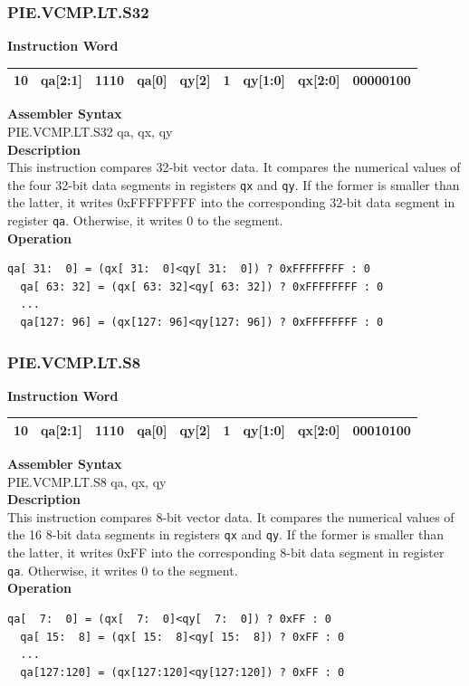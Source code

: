 \newpage
\subsubsection{PIE.VCMP.LT.S32}\label{instruction:PIEVCMPLTS32}
\setlength\tabcolsep{6pt}
\textbf{Instruction Word} \\
\begin{tabular}{|c|c|c|c|c|c|c|c|c|}
	\hline
	10 & qa[2:1] & 1110 & qa[0] & qy[2] & 1 & qy[1:0] & qx[2:0] & 00000100 \\
	\hline
\end{tabular}

\textbf{Assembler Syntax} \\
PIE.VCMP.LT.S32 qa, qx, qy \\
\textbf{Description} \\
This instruction compares 32-bit vector data. It compares the numerical values of the four 32-bit data segments in registers \lstinline{qx} and \lstinline{qy}. If the former is smaller than the latter, it writes 0xFFFFFFFF into the corresponding 32-bit data segment in register \lstinline{qa}. Otherwise, it writes 0 to the segment.\\
\textbf{Operation}
\begin{lstlisting}[escapeinside=`?]
  qa[ 31:  0] = (qx[ 31:  0]<qy[ 31:  0]) ? 0xFFFFFFFF : 0
  qa[ 63: 32] = (qx[ 63: 32]<qy[ 63: 32]) ? 0xFFFFFFFF : 0
  ...
  qa[127: 96] = (qx[127: 96]<qy[127: 96]) ? 0xFFFFFFFF : 0
\end{lstlisting}

\newpage
\subsubsection{PIE.VCMP.LT.S8}\label{instruction:PIEVCMPLTS8}
\setlength\tabcolsep{6pt}
\textbf{Instruction Word} \\
\begin{tabular}{|c|c|c|c|c|c|c|c|c|}
	\hline
	10 & qa[2:1] & 1110 & qa[0] & qy[2] & 1 & qy[1:0] & qx[2:0] & 00010100 \\
	\hline
\end{tabular}

\textbf{Assembler Syntax} \\
PIE.VCMP.LT.S8 qa, qx, qy \\
\textbf{Description} \\
This instruction compares 8-bit vector data. It compares the numerical values of the 16 8-bit data segments in registers \lstinline{qx} and \lstinline{qy}. If the former is smaller than the latter, it writes 0xFF into the corresponding 8-bit data segment in register \lstinline{qa}. Otherwise, it writes 0 to the segment.\\
\textbf{Operation}
\begin{lstlisting}[escapeinside=`?]
  qa[  7:  0] = (qx[  7:  0]<qy[  7:  0]) ? 0xFF : 0
  qa[ 15:  8] = (qx[ 15:  8]<qy[ 15:  8]) ? 0xFF : 0
  ...
  qa[127:120] = (qx[127:120]<qy[127:120]) ? 0xFF : 0
\end{lstlisting}

